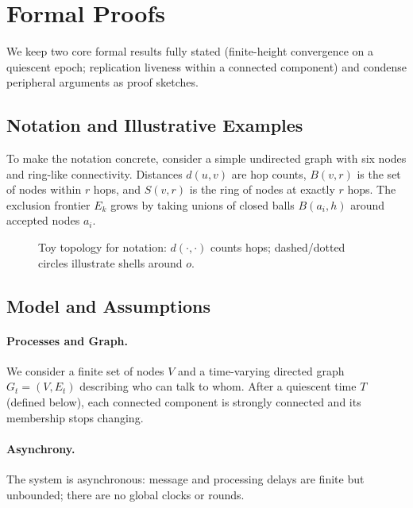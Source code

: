 \documentclass[runningheads]{llncs}
\begin{document}
\section{Formal Proofs}
We keep two core formal results fully stated (finite-height convergence on a quiescent epoch; replication liveness within a connected component) and condense peripheral arguments as proof sketches.

\subsection{Notation and Illustrative Examples}
To make the notation concrete, consider a simple undirected graph with six nodes and ring-like connectivity. Distances $d(u,v)$ are hop counts, $B(v,r)$ is the set of nodes within $r$ hops, and $S(v,r)$ is the ring of nodes at exactly $r$ hops. The exclusion frontier $E_k$ grows by taking unions of closed balls $B(a_i,h)$ around accepted nodes $a_i$.

\begin{figure}
  \centering
  \caption{Toy topology for notation: $d(\cdot,\cdot)$ counts hops; dashed/dotted circles illustrate shells around $o$.}
\end{figure}
\FloatBarrier

\subsection{Model and Assumptions}
\paragraph{Processes and Graph.} We consider a finite set of nodes $V$ and a time-varying directed graph $G_t=(V,E_t)$ describing who can talk to whom. After a quiescent time $T$ (defined below), each connected component is strongly connected and its membership stops changing.
\paragraph{Asynchrony.} The system is asynchronous: message and processing delays are finite but unbounded; there are no global clocks or rounds.
\end{document}
